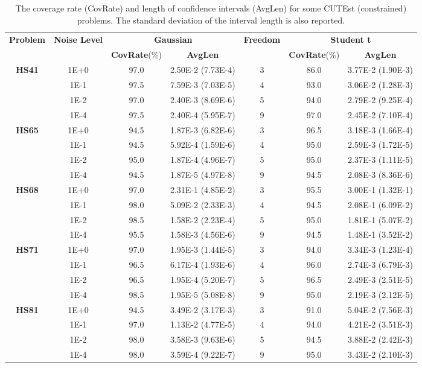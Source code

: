 \documentclass[aos]{imsart}
\numberwithin{equation}{section}
\theoremstyle{plain}
\begin{document}
\begin{table}[h]
  \centering
  \caption{The coverage rate (CovRate) and length of confidence intervals (AvgLen) for some CUTEst (constrained) problems. The standard deviation of the interval length is also reported.}
  \label{tab:cutest_covrate}
  \begin{tabular}{ccccccc}
    \hline
    \multirow{2}{*}{\textbf{Problem}} & \multirow{2}{*}{\textbf{Noise Level}} & \multicolumn{2}{c}{\textbf{Gaussian}} & \multirow{2}{*}{\textbf{Freedom}}  & \multicolumn{2}{c}{\textbf{Student t}} \\
    & & \textbf{CovRate}(\%) & \textbf{AvgLen} &  & \textbf{CovRate}(\%) & \textbf{AvgLen}\\
    \hline
    \multirow{4}{*}{\textbf{HS41}} & 1E+0 & 97.0 & 2.50E-2 (7.73E-4) & 3 & 86.0 & 3.77E-2 (1.90E-3) \\
    & 1E-1 & 97.5 & 7.59E-3 (7.03E-5) & 4 & 93.0 & 3.06E-2 (1.28E-3) \\
    & 1E-2 & 97.0 & 2.40E-3 (8.69E-6) & 5 & 94.0 & 2.79E-2 (9.25E-4)\\
    & 1E-4 & 97.5 & 2.40E-4 (5.95E-7)& 9 & 97.0 & 2.45E-2 (7.10E-4)\\
    \hline
    \multirow{3}{*}{\textbf{HS65}} & 1E+0 & 94.5 & 1.87E-3 (6.82E-6) & 3 & 96.5 & 3.18E-3 (1.66E-4)\\
    & 1E-1 & 94.5 & 5.92E-4 (1.59E-6) & 4 & 95.0 & 2.59E-3 (1.72E-5)\\
    & 1E-2 & 95.0 & 1.87E-4 (4.96E-7) & 5 & 95.0 & 2.37E-3 (1.11E-5)\\
    & 1E-4 & 94.5 & 1.87E-5 (4.97E-8) & 9 & 94.5 & 2.08E-3 (8.36E-6)\\
    \hline
    \multirow{3}{*}{\textbf{HS68}} & 1E+0 & 97.0 & 2.31E-1 (4.85E-2) & 3 & 95.5 & 3.00E-1 (1.32E-1)\\
    & 1E-1 & 98.0 & 5.09E-2 (2.33E-3) & 4 & 94.5 & 2.08E-1 (6.09E-2) \\
    & 1E-2 & 98.5 & 1.58E-2 (2.23E-4) & 5 & 95.0 & 1.81E-1 (5.07E-2)\\
    & 1E-4 & 95.5 & 1.58E-3 (4.56E-6) & 9 & 94.5 & 1.48E-1 (3.52E-2) \\
    \hline
    \multirow{3}{*}{\textbf{HS71}} & 1E+0 & 97.0 & 1.95E-3 (1.44E-5) & 3 & 94.0 & 3.34E-3 (1.23E-4)\\
    & 1E-1 & 96.5 &  6.17E-4 (1.93E-6) & 4 & 96.0 &  2.74E-3 (6.79E-3)\\
    & 1E-2 & 96.5 & 1.95E-4 (5.20E-7) & 5 & 96.5 & 2.49E-3 (2.51E-5)\\
    & 1E-4 & 98.5 & 1.95E-5 (5.08E-8) & 9 & 95.0 & 2.19E-3 (2.12E-5) \\
    \hline
    \multirow{3}{*}{\textbf{HS81}} & 1E+0 & 94.5 & 3.49E-2 (3.17E-3)  & 3 & 91.0 &  5.04E-2 (7.56E-3)\\
    & 1E-1 & 97.0 & 1.13E-2 (4.77E-5) & 4 & 94.0 & 4.21E-2 (3.51E-3)\\
    & 1E-2 & 98.0 &  3.58E-3 (9.63E-6) & 5 &  94.5 & 3.88E-2 (2.42E-3)\\
    & 1E-4 & 98.0 & 3.59E-4 (9.22E-7) & 9 &  95.0 & 3.43E-2 (2.10E-3) \\
    \hline
  \end{tabular}
\end{table}
\end{document}
